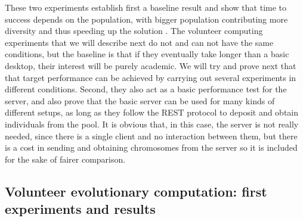 \documentclass[journal,onecolumn]{IEEEtran}
\begin{document}
These two experiments establish first a baseline result and show that
time to success depends on the population, with bigger population
contributing more diversity and thus speeding up the solution \cite{DBLP:conf/lion/LaredoDFGB13}. The volunteer computing
experiments that we will describe next do not and can not have the
same conditions, but  
the baseline is that if they eventually take longer than a basic
desktop, their interest will be purely academic. We will try and
prove next that that target performance can be achieved by carrying
out several experiments in different conditions. Second, they also act
as a basic performance test for the server, and also prove that the
basic server can be used for many kinds of different setups, as long
as they follow the REST protocol to deposit and obtain individuals
from the pool. It is obvious that, in this case, the server is not
really needed, since there is a single client and no interaction
between them, but there is a cost in sending and obtaining chromosomes
from the server so it is included for the sake of fairer comparison.

\subsection{Volunteer evolutionary computation: first experiments and results}
\end{document}
